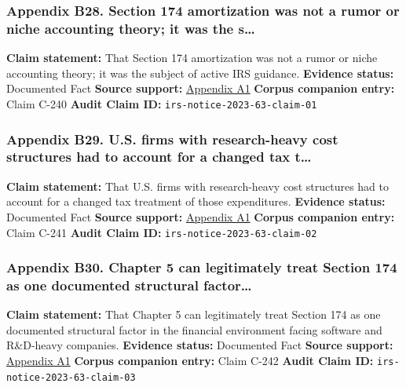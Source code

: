 \documentclass[
  american,
  11pt,
  letterpaper,
]{article}
\begin{document}
\subsubsection{Appendix B28. Section 174 amortization was not a rumor or
niche accounting theory; it was the
s\ldots{}}\label{appendix-b28-section-174-amortization-was-not-a-rumor-or-niche-accounting-theory-it-was-the-s}

\textbf{Claim statement:} That Section 174 amortization was not a rumor
or niche accounting theory; it was the subject of active IRS guidance.
\textbf{Evidence status:} Documented Fact \textbf{Source support:}
\hyperref[appendix-a1-notice-2023-63-guidance-on-section-174-and-specified-research-or-experimental-expenditures]{Appendix
A1} \textbf{Corpus companion entry:} Claim C-240 \textbf{Audit Claim
ID:} \texttt{irs-notice-2023-63-claim-01}

\subsubsection{Appendix B29. U.S. firms with research-heavy cost
structures had to account for a changed tax
t\ldots{}}\label{appendix-b29-u-s-firms-with-research-heavy-cost-structures-had-to-account-for-a-changed-tax-t}

\textbf{Claim statement:} That U.S. firms with research-heavy cost
structures had to account for a changed tax treatment of those
expenditures. \textbf{Evidence status:} Documented Fact \textbf{Source
support:}
\hyperref[appendix-a1-notice-2023-63-guidance-on-section-174-and-specified-research-or-experimental-expenditures]{Appendix
A1} \textbf{Corpus companion entry:} Claim C-241 \textbf{Audit Claim
ID:} \texttt{irs-notice-2023-63-claim-02}

\subsubsection{Appendix B30. Chapter 5 can legitimately treat Section
174 as one documented structural
factor\ldots{}}\label{appendix-b30-chapter-5-can-legitimately-treat-section-174-as-one-documented-structural-factor}

\textbf{Claim statement:} That Chapter 5 can legitimately treat Section
174 as one documented structural factor in the financial environment
facing software and R\&D-heavy companies. \textbf{Evidence status:}
Documented Fact \textbf{Source support:}
\hyperref[appendix-a1-notice-2023-63-guidance-on-section-174-and-specified-research-or-experimental-expenditures]{Appendix
A1} \textbf{Corpus companion entry:} Claim C-242 \textbf{Audit Claim
ID:} \texttt{irs-notice-2023-63-claim-03}
\end{document}
